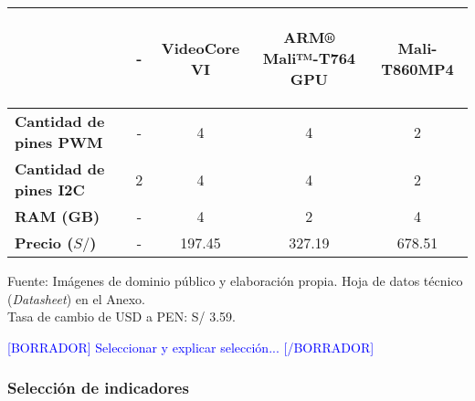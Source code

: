 \begin{savenotes}
\begin{mytable}[H]
\begin{tabular}{l|c|c|c|c|}
{			} & - & VideoCore VI & 		
			\begin{minipage}{\mythirdmaxsizeofcontenttable}\begin{myflushcenter}
				ARM® Mali™-T764 GPU
			\end{myflushcenter}\end{minipage}
			 &  		
			\begin{minipage}{\mythirdmaxsizeofcontenttable}\begin{myflushcenter}
				Mali-T860MP4
			\end{myflushcenter}\end{minipage} \\ \hline		
			\multicolumn{1}{|l|}{
				\begin{minipage}{\myforthmaxsizeofcontenttable}	
					\textbf{Cantidad de pines PWM}
				\end{minipage}
			} & - & 4 & 4 & 2 \\ \hline		
			\multicolumn{1}{|l|}{
				\begin{minipage}{\myforthmaxsizeofcontenttable}	
					\textbf{Cantidad de pines I2C}
				\end{minipage}
			} & 2 & 4 & 4 & 2 \\ \hline		
			\multicolumn{1}{|l|}{
				\begin{minipage}{\myforthmaxsizeofcontenttable}	
					\textbf{RAM (GB)}
				\end{minipage}
			} & - & 4 & 2 & 4 \\ \hline
			\multicolumn{1}{|l|}{
				\begin{minipage}{\myforthmaxsizeofcontenttable}	
					\textbf{Precio ($S/$)}
				\end{minipage}
			} & - & 197.45 & 327.19 & 678.51 \\ \hline		
		\end{tabular}
		\begin{flushleft}	
			Fuente: Imágenes de dominio público y elaboración propia. Hoja de datos técnico (\textit{Datasheet}) en el Anexo.\\
			Tasa de cambio de USD a PEN: S/ 3.59.
		\end{flushleft}
	\end{mytable}
\end{savenotes}

\textcolor{blue}{[BORRADOR] Seleccionar y explicar selección... [/BORRADOR]}

\subsubsection{Selección de indicadores}

